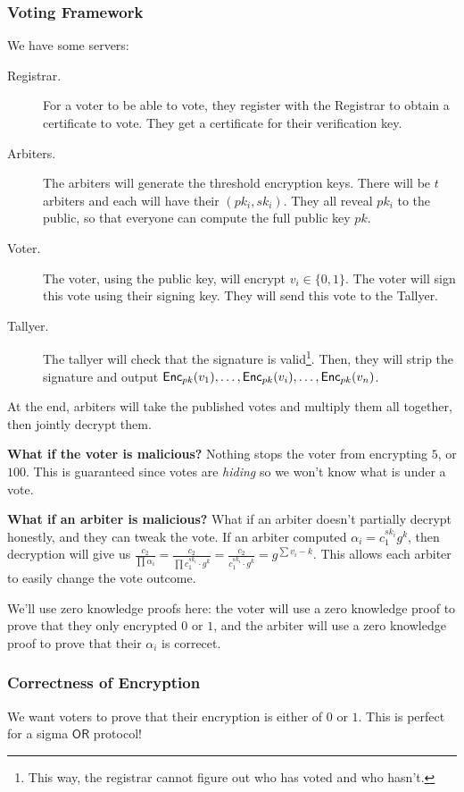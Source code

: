 \subsubsection{Voting Framework}
We have some servers:
\begin{description}
    \item[Registrar.] For a voter to be able to vote, they register with the Registrar to obtain a certificate to vote. They get a certificate for their verification key.
    \item[Arbiters.] The arbiters will generate the threshold encryption keys. There will be $t$ arbiters and each will have their $(pk_i, sk_i)$. They all reveal $pk_i$ to the public, so that everyone can compute the full public key $pk$.
    \item[Voter.] The voter, using the public key, will encrypt $v_i \in\{0, 1\}$. The voter will sign this vote using their signing key. They will send this vote to the Tallyer.
    \item[Tallyer.] The tallyer will check that the signature is valid\footnote{This way, the registrar cannot figure out who has voted and who hasn't.}. Then, they will strip the signature and output $\operatorname{\mathsf{Enc}}_{pk}(v_1), \dots, \operatorname{\mathsf{Enc}}_{pk}(v_i), \dots, \operatorname{\mathsf{Enc}}_{pk}(v_n)$.
\end{description}
At the end, arbiters will take the published votes and multiply them all together, then jointly decrypt them.

\textbf{What if the voter is malicious?} Nothing stops the voter from encrypting $5$, or $100$. This is guaranteed since votes are \emph{hiding} so we won't know what is under a vote.

\textbf{What if an arbiter is malicious?} What if an arbiter doesn't partially decrypt honestly, and they can tweak the vote. If an arbiter computed $\alpha_i = c_1^{sk_i}g^k$, then decryption will give us $\frac{c_2}{\prod \alpha_i} = \frac{c_2}{\prod c_1^{sk_i}\cdot g^k} = \frac{c_2}{c_1^{sk_i}\cdot g^k} = g^{\sum v_i - k}$. This allows each arbiter to easily change the vote outcome.

We'll use zero knowledge proofs here: the voter will use a zero knowledge proof to prove that they only encrypted $0$ or $1$, and the arbiter will use a zero knowledge proof to prove that their $\alpha_i$ is correcet.

\subsubsection{Correctness of Encryption}
We want voters to prove that their encryption is either of $0$ or $1$. This is perfect for a sigma $\mathsf{OR}$ protocol!

